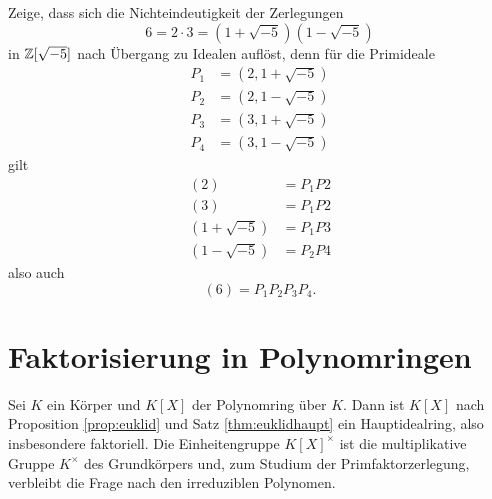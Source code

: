 \documentclass{book}
\begin{document}
\begin{prob}
    \label{prob:6}
    Zeige, dass sich die Nichteindeutigkeit der Zerlegungen
    \[
        6 = 2 \cdot 3 = (1   + \sqrt{-5})(1 - \sqrt{-5})
    \] 
    in $\mathbb{Z}[\sqrt{-5}]$ nach Übergang zu Idealen auflöst, denn für die Primideale
    \begin{align*}
        P_1 & = (2, 1 + \sqrt{-5})\\
        P_2 & = (2, 1 - \sqrt{-5})\\
        P_3 & = (3, 1 + \sqrt{-5})\\
        P_4 & = (3, 1 - \sqrt{-5})
    \end{align*}
    gilt
    \begin{align*}
        (2) & = P_1 P2\\
        (3) & = P_1 P2\\
        (1 + \sqrt{-5}) & = P_1 P3\\
        (1 - \sqrt{-5}) & = P_2 P4
    \end{align*}
    also auch
    \[
        (6) = P_1 P_2 P_3 P_4.
    \]
\end{prob}

\section{Faktorisierung in Polynomringen}%
\label{sec:polynomringe}

Sei $K$ ein Körper und $K[X]$ der Polynomring über $K$. Dann ist $K[X]$ nach
Proposition \ref{prop:euklid} und Satz \ref{thm:euklidhaupt} ein
Hauptidealring, also insbesondere faktoriell. Die Einheitengruppe
$K[X]^{\times}$ ist die multiplikative Gruppe $K^{\times}$ des Grundkörpers
und, zum Studium der Primfaktorzerlegung, verbleibt die Frage nach den
irreduziblen Polynomen. 
\end{document}
